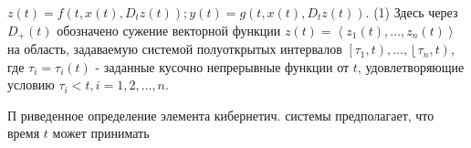 \documentclass[10pt]{article}
\begin{document}
$z(t)=f\left(t, x(t), D_{t} z(t)\right) ; y(t)=g\left(t, x(t), D_{t} z(t)\right)$. (1) Здесь через $D_{+}(t)$ обозначено сужение векторной функции $z(t)=\left\langle z_{1}(t), \ldots, z_{n}(t)\right\rangle$ на область, задаваемую системой полуоткрытых интервалов $\left[\tau_{1}, t\right), \ldots,\left\lfloor\tau_{n}, t\right)$, где $\tau_{i}=\tau_{i}(t)$ - заданные кусочно непрерывные функции от $t$, удовлетворяющие условию $\tau_{i}<t, i=1,2, \ldots, n$.



П риведенное определение элемента кибернетич. системы предполагает, что время $t$ может принимать
\end{document}
